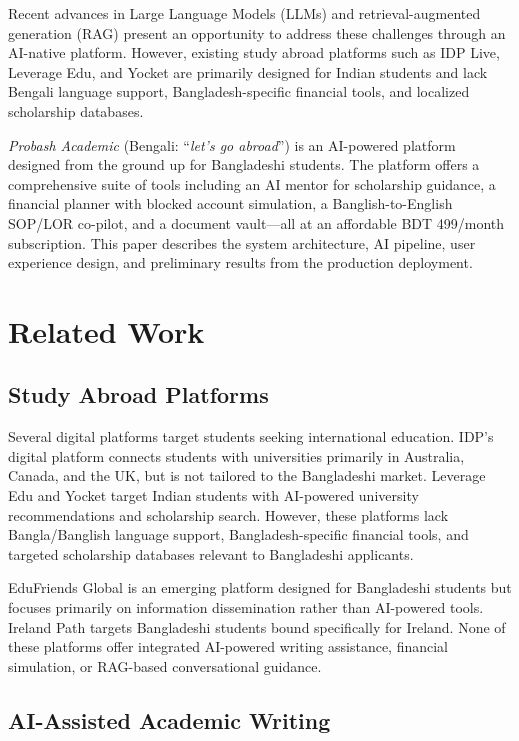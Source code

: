 \documentclass[conference]{IEEEtran}
\begin{document}
Recent advances in Large Language Models (LLMs) and retrieval-augmented generation (RAG) present an opportunity to address these challenges through an AI-native platform. However, existing study abroad platforms such as IDP Live, Leverage Edu, and Yocket are primarily designed for Indian students and lack Bengali language support, Bangladesh-specific financial tools, and localized scholarship databases.

\textit{Probash Academic} (Bengali: ``\textit{let's go abroad}'') is an AI-powered platform designed from the ground up for Bangladeshi students. The platform offers a comprehensive suite of tools including an AI mentor for scholarship guidance, a financial planner with blocked account simulation, a Banglish-to-English SOP/LOR co-pilot, and a document vault—all at an affordable BDT 499/month subscription. This paper describes the system architecture, AI pipeline, user experience design, and preliminary results from the production deployment.

\section{Related Work}
\label{sec:related}

\subsection{Study Abroad Platforms}

Several digital platforms target students seeking international education. IDP's digital platform connects students with universities primarily in Australia, Canada, and the UK, but is not tailored to the Bangladeshi market. Leverage Edu and Yocket target Indian students with AI-powered university recommendations and scholarship search. However, these platforms lack Bangla/Banglish language support, Bangladesh-specific financial tools, and targeted scholarship databases relevant to Bangladeshi applicants.

EduFriends Global \cite{edufriends} is an emerging platform designed for Bangladeshi students but focuses primarily on information dissemination rather than AI-powered tools. Ireland Path \cite{irelandpath} targets Bangladeshi students bound specifically for Ireland. None of these platforms offer integrated AI-powered writing assistance, financial simulation, or RAG-based conversational guidance.

\subsection{AI-Assisted Academic Writing}
\end{document}

